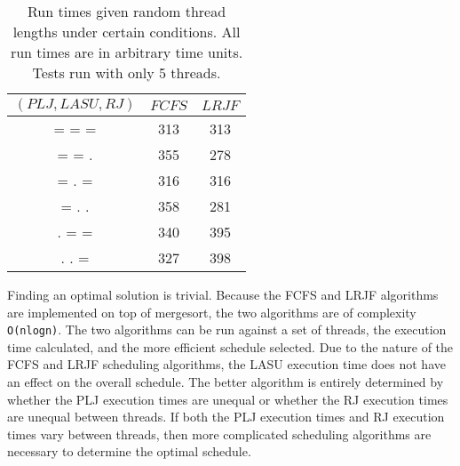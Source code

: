 \documentclass[letterpaper,12pt]{article}
\begin{document}
\begin{table}[ht]
\begin{center}
\caption{Run times given random thread lengths under certain conditions. All run times are in arbitrary time units. Tests run with only 5 threads.}
\begin{tabular}{|c|cc|} 
\hline
\multicolumn{1}{|c|}{$(PLJ, LASU, RJ)$} &
\multicolumn{1}{c}{$FCFS$} &
\multicolumn{1}{c|}{$LRJF$} \\
\hline
= = = & 313 & 313 \\
= = .  & 355 & 278 \\
= . = & 316 & 316 \\
= . . & 358 & 281 \\
. = = & 340 & 395 \\
. . = & 327 & 398 \\
\hline
\end{tabular}
\end{center}
\end{table}

Finding an optimal solution is trivial.
Because the FCFS and LRJF algorithms are implemented on top of mergesort, the two algorithms are of complexity \texttt{O(nlogn)}.
The two algorithms can be run against a set of threads, the execution time calculated, and the more efficient schedule selected.
Due to the nature of the FCFS and LRJF scheduling algorithms, the LASU execution time does not have an effect on the overall schedule.
The better algorithm is entirely determined by whether the PLJ execution times are unequal or whether the RJ execution times are unequal between threads.
If both the PLJ execution times and RJ execution times vary between threads, then more complicated scheduling algorithms are necessary to determine the optimal schedule.
\end{document}
